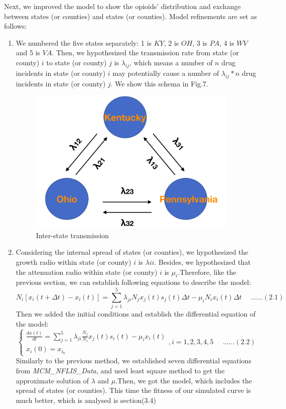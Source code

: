 \documentclass[12pt]{article}
\begin{document}
Next, we improved the model to show the opioids' distribution and exchange between states (or counties) and states (or counties). Model refinements are set as follows:
  \begin{enumerate}[\bfseries 1.]
    \item We numbered the five states separately: 1 is $KY$, 2 is $OH$, 3 is $PA$, 4 is $WV$ and 5 is $VA$. Then, we hypothesized the transmission rate from state (or county) $i$ to state (or county) $j$ is $\lambda_{ij}$, which means a number of $n$ drug incidents in state (or county) $i$ may potentially cause a number of $\lambda_{ij}*n$ drug incidents in state (or county) $j$. We show this schema in Fig.7.

\begin{figure}[!htbp]
\centering
\includegraphics[width=10cm]{Fig/illustration}
\caption{Inter-state transmission}
\end{figure}

    \item Considering the internal spread of states (or counties), we hypothesized the growth radio within state (or county) $i$ is $\lambda{ii}$. Besides, we hypothesized that the attenuation radio within state (or county) $i$ is $\mu_i$.Therefore, like the previous section, we can establish following equations to describe the model:
$$
N_i[x_i(t+\Delta t) - x_i(t)] = \sum^5_{j=1}\lambda_{ji}N_jx_j(t)s_j(t)\Delta t - \mu_i N_ix_i(t)\Delta t \ \ \ \ \ \ ......(2.1)
$$
Then we added the initial conditions and establish the differential equation of the model:
$$
  \begin{cases} 
      \frac{dx(t)}{dt} = \sum^5_{j=1} \lambda_{ji}\frac{N_j}{N_i}x_j(t)s_i(t) - \mu_i x_i(t)  \\
      x_i(0) = x_{i_0}
  \end{cases}
, i = 1,2,3,4,5 \ \ \ \ \ \ ......(2.2)
$$
Similarly to the previous method, we established seven differential equations from \textit{MCM\_NFLIS\_Data}, and used least square method to get the approximate solution of $\lambda$ and $\mu$.Then, we got the model, which includes the spread of states (or counties). This time the fitness of our simulated curve is much better, which is analysed is section(3.4)
\end{enumerate}
\end{document}
